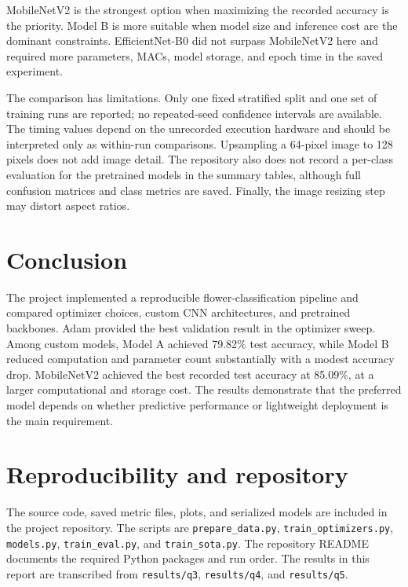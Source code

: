 \documentclass[11pt,a4paper]{article}
\newcommand{\class}[1]{\texttt{#1}}
\begin{document}
MobileNetV2 is the strongest option when maximizing the recorded accuracy is
the priority. Model B is more suitable when model size and inference cost are
the dominant constraints. EfficientNet-B0 did not surpass MobileNetV2 here and
required more parameters, MACs, model storage, and epoch time in the saved
experiment.

The comparison has limitations. Only one fixed stratified split and one set
of training runs are reported; no repeated-seed confidence intervals are
available. The timing values depend on the unrecorded execution hardware and
should be interpreted only as within-run comparisons. Upsampling a 64-pixel
image to 128 pixels does not add image detail. The repository also does not
record a per-class evaluation for the pretrained models in the summary tables,
although full confusion matrices and class metrics are saved. Finally, the
image resizing step may distort aspect ratios.

\section{Conclusion}
The project implemented a reproducible flower-classification pipeline and
compared optimizer choices, custom CNN architectures, and pretrained
backbones. Adam provided the best validation result in the optimizer sweep.
Among custom models, Model A achieved 79.82\% test accuracy, while Model B
reduced computation and parameter count substantially with a modest accuracy
drop. MobileNetV2 achieved the best recorded test accuracy at 85.09\%, at a
larger computational and storage cost. The results demonstrate that the
preferred model depends on whether predictive performance or lightweight
deployment is the main requirement.

\section*{Reproducibility and repository}
The source code, saved metric files, plots, and serialized models are included
in the project repository. The scripts are \class{prepare\_data.py},
\class{train\_optimizers.py}, \class{models.py}, \class{train\_eval.py}, and
\class{train\_sota.py}. The repository README documents the required Python
packages and run order. The results in this report are transcribed from
\class{results/q3}, \class{results/q4}, and \class{results/q5}.
\end{document}

